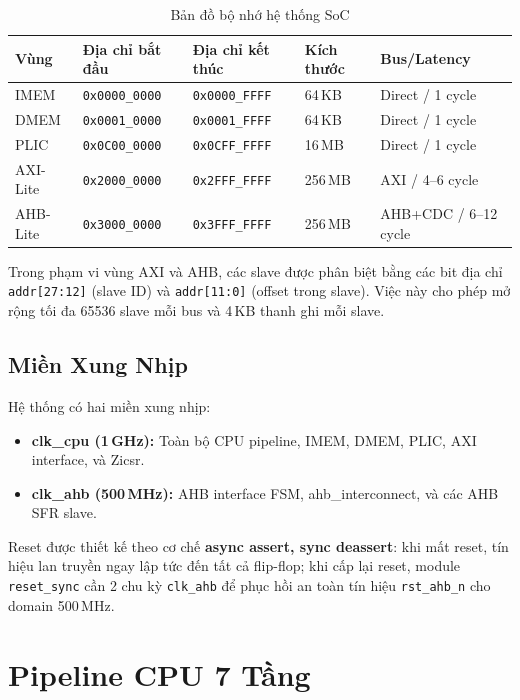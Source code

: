 \begin{table}[htbp]
\caption{Bản đồ bộ nhớ hệ thống SoC}
\label{tab:memory-map}
\begin{center}
\begin{tabular}{|l|l|l|l|l|}
\hline
\textbf{Vùng} & \textbf{Địa chỉ bắt đầu} & \textbf{Địa chỉ kết thúc} & \textbf{Kích thước} & \textbf{Bus/Latency} \\ \hline
IMEM & \texttt{0x0000\_0000} & \texttt{0x0000\_FFFF} & 64\,KB & Direct / 1 cycle \\ \hline
DMEM & \texttt{0x0001\_0000} & \texttt{0x0001\_FFFF} & 64\,KB & Direct / 1 cycle \\ \hline
PLIC & \texttt{0x0C00\_0000} & \texttt{0x0CFF\_FFFF} & 16\,MB & Direct / 1 cycle \\ \hline
AXI-Lite & \texttt{0x2000\_0000} & \texttt{0x2FFF\_FFFF} & 256\,MB & AXI / 4--6 cycle \\ \hline
AHB-Lite & \texttt{0x3000\_0000} & \texttt{0x3FFF\_FFFF} & 256\,MB & AHB+CDC / 6--12 cycle \\ \hline
\end{tabular}
\end{center}
\end{table}

Trong phạm vi vùng AXI và AHB, các slave được phân biệt bằng các bit địa chỉ \texttt{addr[27:12]} (slave ID) và \texttt{addr[11:0]} (offset trong slave). Việc này cho phép mở rộng tối đa 65536 slave mỗi bus và 4\,KB thanh ghi mỗi slave.

\subsection{Miền Xung Nhịp}

Hệ thống có hai miền xung nhịp:
\begin{itemize}
    \item \textbf{clk\_cpu (1\,GHz):} Toàn bộ CPU pipeline, IMEM, DMEM, PLIC, AXI interface, và Zicsr.
    \item \textbf{clk\_ahb (500\,MHz):} AHB interface FSM, ahb\_interconnect, và các AHB SFR slave.
\end{itemize}

Reset được thiết kế theo cơ chế \textbf{async assert, sync deassert}: khi mất reset, tín hiệu lan truyền ngay lập tức đến tất cả flip-flop; khi cấp lại reset, module \texttt{reset\_sync} cần 2 chu kỳ \texttt{clk\_ahb} để phục hồi an toàn tín hiệu \texttt{rst\_ahb\_n} cho domain 500\,MHz.

\section{Pipeline CPU 7 Tầng}

